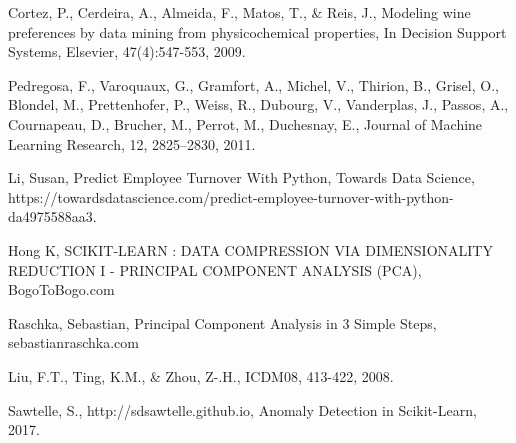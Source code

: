 \documentclass[12pt,preprint]{aastex61}
\begin{document}


\begin{thebibliography}{}

 Cortez, P., Cerdeira, A.,
  Almeida, F., Matos, T., \& Reis, J., Modeling wine preferences by
  data mining from physicochemical properties, In Decision Support
  Systems, Elsevier, 47(4):547-553, 2009.


 Pedregosa, F.,
  Varoquaux, G., Gramfort, A., Michel, V., Thirion, B., Grisel, O.,
  Blondel, M.,  Prettenhofer, P., Weiss, R., Dubourg, V., Vanderplas, J.,
  Passos, A., Cournapeau, D., Brucher, M., Perrot, M., Duchesnay, E.,
  Journal of Machine Learning Research, 12, 2825--2830, 2011.


 Li, Susan, Predict Employee Turnover With Python,
  Towards Data Science, https://towardsdatascience.com/predict-employee-turnover-with-python-da4975588aa3.

 Hong K, SCIKIT-LEARN : DATA COMPRESSION VIA DIMENSIONALITY REDUCTION I - PRINCIPAL COMPONENT ANALYSIS (PCA), BogoToBogo.com

 Raschka, Sebastian, Principal Component Analysis
in 3 Simple Steps, sebastianraschka.com

 Liu, F.T., Ting, K.M.,
  \& Zhou, Z-.H., ICDM08, 413-422, 2008.

 Sawtelle, S., http://sdsawtelle.github.io,
  Anomaly Detection in Scikit-Learn, 2017.
  

\end{thebibliography}
\end{document}
